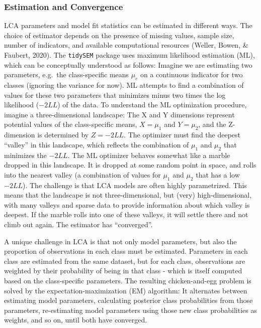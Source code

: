 \documentclass[
  ,man,floatsintext]{apa6}
\begin{document}
\hypertarget{estimation-and-convergence}{%
\subsubsection{Estimation and Convergence}\label{estimation-and-convergence}}

LCA parameters and model fit statistics can be estimated in different
ways.
The choice of estimator depends on the presence of missing
values, sample size, number of indicators, and available computational
resources (Weller, Bowen, \& Faubert, 2020).
The \texttt{tidySEM} package uses maximum likelihood estimation (ML), which can be conceptually understood as follows:
Imagine we are estimating two
parameters, e.g.~the class-specific means \(\mu_c\) on a continuous indicator for two classes
(ignoring the variance for now).
ML attempts to find a combination of values for these two parameters that minimizes minus two times the log likelihood (\(-2LL\)) of the data.
To understand the ML optimization procedure,
imagine a three-dimensional landscape:
The X and Y dimensions represent potential values of the class-specific means, \(X = \mu_1\) and \(Y = \mu_2\), and the Z-dimension is determined by \(Z = -2LL\).
The optimizer must find the
deepest ``valley'' in this landscape,
which reflects the combination of \(\mu_1\) and \(\mu_2\) that minimizes the \(-2LL\).
The ML
optimizer behaves somewhat like a marble dropped in this landscape. It
is dropped at some random point in space, and rolls into the nearest valley (a combination of values for \(\mu_1\) and \(\mu_2\) that has a low \(-2LL\)).
The challenge is that LCA models are often highly parametrized.
This means that the landscape is not three-dimensional, but (very) high-dimensional,
with many valleys and sparse data to provide information about which valley is deepest.
If the marble rolls into one of these valleys,
it will settle there and not climb out again.
The estimator has ``converged''.

A unique challenge in LCA is that not only model parameters,
but also the proportion of observations in each class must be estimated.
Parameters in each class are estimated from the same dataset,
but for each class,
observations are weighted by their probability of being in that class - which is itself computed based on the class-specific parameters.
The resulting chicken-and-egg problem is solved by the expectation-maximization (EM) algorithm:
It alternates between estimating model parameters,
calculating posterior class probabilities from those parameters,
re-estimating model parameters using those new class probabilities as weights, and so on, until both have converged.
\end{document}
